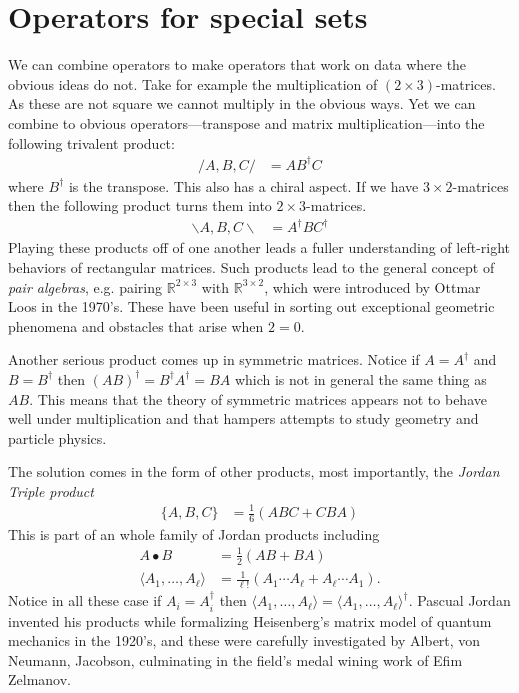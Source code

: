 \section{Operators for special sets}
We can combine operators to make operators that work on data where the 
obvious ideas do not.  Take for example the multiplication of $(2\times 3)$-matrices.
As these are not square we cannot multiply in the obvious ways.  Yet 
we can combine to obvious operators---transpose and matrix multiplication---into  
the following trivalent product:
\begin{align*}
    /A,B,C/ & = AB^{\dagger}C
\end{align*}
where $B^{\dagger}$ is the transpose.  This also has a chiral aspect.  If we have
$3\times 2$-matrices then the following product turns them into $2\times 3$-matrices.
\begin{align*}
    \backslash A,B,C\backslash & = A^{\dagger} B C^{\dagger}
\end{align*}
Playing these products off of one another leads a fuller understanding of left-right 
behaviors of rectangular matrices.
Such products lead to the general 
concept of \emph{pair algebras}, e.g. pairing $\mathbb{R}^{2\times 3}$ 
with $\mathbb{R}^{3\times 2}$, which were introduced by Ottmar Loos in the 1970's.
  These have been useful in sorting out exceptional geometric 
phenomena and obstacles that arise when $2=0$.


Another serious product comes up 
in symmetric matrices.  Notice if $A=A^{\dagger}$ and $B=B^{\dagger}$
then $(AB)^{\dagger}=B^{\dagger}A^{\dagger}=BA$ which is not in general 
the same thing as $AB$.  This means that the theory of symmetric matrices 
appears not to behave well under multiplication and that hampers attempts 
to study geometry and particle physics.

The solution comes in the form of other products, most importantly, 
the  \emph{Jordan Triple product}
\begin{align*}
    \{A,B,C\} & = \frac{1}{6}(ABC+CBA)
\end{align*}
This is part of an whole family of Jordan products including 
\begin{align*}
    A\bullet B & = \frac{1}{2}(AB+BA)\\
    \langle A_1,\ldots,A_{\ell}\rangle & = \frac{1}{\ell!}(A_1\cdots A_{\ell}+A_{\ell}\cdots A_1).
\end{align*}
Notice in all these case if $A_i=A_i^{\dagger}$ then $\langle A_1,\ldots,A_{\ell}\rangle=
\langle A_1,\ldots,A_{\ell}\rangle^{\dagger}$.  Pascual Jordan invented his products while formalizing 
Heisenberg's matrix model of quantum mechanics in the 1920's, and these were 
carefully investigated by Albert, von Neumann, Jacobson, culminating in the 
field's medal wining work of Efim Zelmanov.


